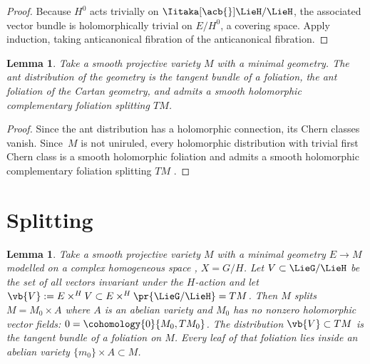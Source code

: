 \documentclass[pdftex]{sigma}
\numberwithin{equation}{section}
\newtheorem{Lemma}[Theorem]{Lemma}
\newcommand*{\acf}[1]{\Iitaka[\acb{}]{#1}}
\begin{document}
\begin{proof}
Because $H^0$ acts trivially on $\acf\LieH/\LieH$, the associated vector bundle is
holomorphically trivial on $E/H^0$, a covering space.
Apply induction, taking anticanonical fibration of the anticanonical fibration.
\end{proof}

\begin{Lemma}
Take a smooth projective variety $M$ with a minimal geometry.
The ant distribution of the geometry is the tangent bundle of a foliation, the \emph{ant foliation} of the Cartan geometry, and admits a smooth holomorphic complementary foliation splitting $TM$.
\end{Lemma}

\begin{proof}
Since the ant distribution has a holomorphic connection, its Chern classes vanish.
Since~$M$ is not uniruled, every holomorphic distribution with trivial first Chern class is a smooth holomorphic foliation and admits a smooth holomorphic complementary foliation splitting $TM$ \cite[Theorem 5.2]{Loray/Pereira/Touzet:2011}.
\end{proof}

\section{Splitting}\label{section:splitting}

\begin{Lemma}\label{lemma:symmetry.splitting}
Take a smooth projective variety $M$ with a minimal geometry $E \to M$ modelled on a complex homogeneous space , $X = G/H$.
Let $V \subset \LieG/\LieH$ be the set of all vectors invariant under the $H$-action and let $\vb{V}:= E \times^H V \subset E \times^H \pr{\LieG/\LieH} = TM$.
Then $M$ splits~${M = M_0 \times A}$ where $A$ is an abelian variety and $M_0$ has no nonzero holomorphic vector fields: $0=\cohomology{0}{M_0,TM_0}$.
The distribution $\vb{V} \subset TM$ is the tangent bundle of a foliation on $M$.
Every leaf of that foliation lies inside an abelian variety $\{m_0\} \times A \subset M$.
\end{Lemma}
\end{document}
